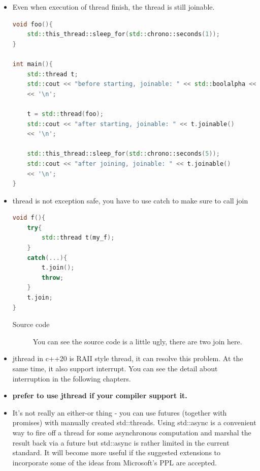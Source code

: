 \documentclass[a4paper,11pt,twoside]{book}
\begin{document}
\begin{itemize}
\begin{lstlisting}[frame=single, language=c++]
	t = std::thread(foo);
	std::cout << "after starting, joinable: " << t.joinable() 
	<< '\n';
	
	t.join();
	std::cout << "after joining, joinable: " << t.joinable() 
	<< '\n';
}
\end{lstlisting}


\item Even when execution of thread finish, the thread is still joinable.  

\begin{lstlisting}[frame=single, language=c++]
void foo(){
	std::this_thread::sleep_for(std::chrono::seconds(1));
}

int main(){
	std::thread t;
	std::cout << "before starting, joinable: " << std::boolalpha << t.joinable()
	<< '\n';
	
	t = std::thread(foo);
	std::cout << "after starting, joinable: " << t.joinable() 
	<< '\n';
	
	std::this_thread::sleep_for(std::chrono::seconds(5));
	std::cout << "after joining, joinable: " << t.joinable() 
	<< '\n';
}
\end{lstlisting}


\item thread is not exception safe, you have to use catch to make sure to call join

\begin{lstlisting}[frame=single, language=c++]
void f(){
	try{
		std::thread t(my_f);
	}
	catch(...){
		t.join();
		throw;
	}
	t.join;
}
\end{lstlisting}
\begin{description}
	\item[Source code] You can see the source code is a little ugly, there are two join here. 
\end{description}

\item jthread in c++20 is RAII style thread, it can resolve this problem. At the same time, it also support interrupt. You can see the detail about interruption in the following chapters. 


\item \textbf{prefer to use jthread if your compiler support it.} 

\item It's not really an either-or thing - you can use futures (together with promises) with manually created std::threads. Using std::async is a convenient way to fire off a thread for some asynchronous computation and marshal the result back via a future but std::async is rather limited in the current standard. It will become more useful if the suggested extensions to incorporate some of the ideas from Microsoft's PPL are accepted.


\end{itemize}
\end{document}
